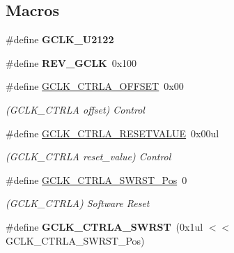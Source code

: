 \subsection*{Macros}
\begin{DoxyCompactItemize}
\item 
\hypertarget{group___s_a_m_l21___g_c_l_k_gafcf2ff025b17342205ec675cb8de796e}{}\#define {\bfseries G\+C\+L\+K\+\_\+\+U2122}\label{group___s_a_m_l21___g_c_l_k_gafcf2ff025b17342205ec675cb8de796e}

\item 
\hypertarget{group___s_a_m_l21___g_c_l_k_gad1c1468b7c6ed891f5711fedfef9ec67}{}\#define {\bfseries R\+E\+V\+\_\+\+G\+C\+L\+K}~0x100\label{group___s_a_m_l21___g_c_l_k_gad1c1468b7c6ed891f5711fedfef9ec67}

\item 
\hypertarget{group___s_a_m_l21___g_c_l_k_ga13c8b1dd25535746180d2279df28be74}{}\#define \hyperlink{group___s_a_m_l21___g_c_l_k_ga13c8b1dd25535746180d2279df28be74}{G\+C\+L\+K\+\_\+\+C\+T\+R\+L\+A\+\_\+\+O\+F\+F\+S\+E\+T}~0x00\label{group___s_a_m_l21___g_c_l_k_ga13c8b1dd25535746180d2279df28be74}

\begin{DoxyCompactList}\small\item\em (G\+C\+L\+K\+\_\+\+C\+T\+R\+L\+A offset) Control \end{DoxyCompactList}\item 
\hypertarget{group___s_a_m_l21___g_c_l_k_gae79c690f810e3f548fef59a384f37ea0}{}\#define \hyperlink{group___s_a_m_l21___g_c_l_k_gae79c690f810e3f548fef59a384f37ea0}{G\+C\+L\+K\+\_\+\+C\+T\+R\+L\+A\+\_\+\+R\+E\+S\+E\+T\+V\+A\+L\+U\+E}~0x00ul\label{group___s_a_m_l21___g_c_l_k_gae79c690f810e3f548fef59a384f37ea0}

\begin{DoxyCompactList}\small\item\em (G\+C\+L\+K\+\_\+\+C\+T\+R\+L\+A reset\+\_\+value) Control \end{DoxyCompactList}\item 
\hypertarget{group___s_a_m_l21___g_c_l_k_ga80fd8a124a472da27e7b69103d559884}{}\#define \hyperlink{group___s_a_m_l21___g_c_l_k_ga80fd8a124a472da27e7b69103d559884}{G\+C\+L\+K\+\_\+\+C\+T\+R\+L\+A\+\_\+\+S\+W\+R\+S\+T\+\_\+\+Pos}~0\label{group___s_a_m_l21___g_c_l_k_ga80fd8a124a472da27e7b69103d559884}

\begin{DoxyCompactList}\small\item\em (G\+C\+L\+K\+\_\+\+C\+T\+R\+L\+A) Software Reset \end{DoxyCompactList}\item 
\hypertarget{group___s_a_m_l21___g_c_l_k_gac74f9dd1b17b30da8fd81a9b84b991be}{}\#define {\bfseries G\+C\+L\+K\+\_\+\+C\+T\+R\+L\+A\+\_\+\+S\+W\+R\+S\+T}~(0x1ul $<$$<$ G\+C\+L\+K\+\_\+\+C\+T\+R\+L\+A\+\_\+\+S\+W\+R\+S\+T\+\_\+\+Pos)\label{group___s_a_m_l21___g_c_l_k_gac74f9dd1b17b30da8fd81a9b84b991be}


\end{DoxyCompactItemize}
